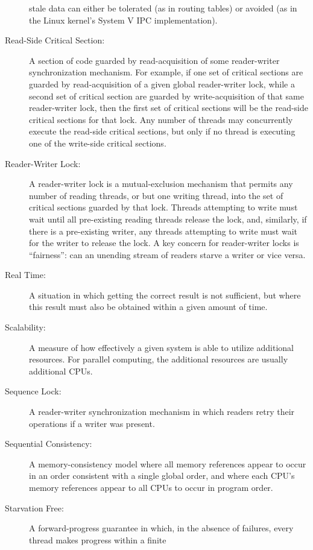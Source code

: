 \begin{description}
	stale data can either be tolerated (as in routing tables)
	or avoided (as in the Linux kernel's System V IPC implementation).
\item[Read-Side Critical Section:]
	A section of code guarded by read-acquisition of
	some reader-writer synchronization mechanism.
	For example, if one set of critical sections are guarded by
	read-acquisition of
	a given global reader-writer lock, while a second set of critical
	section are guarded by write-acquisition of that same reader-writer
	lock, then the first set of critical sections will be the
	read-side critical sections for that lock.
	Any number of threads may concurrently execute the read-side
	critical sections, but only if no thread is executing one of
	the write-side critical sections.
\item[Reader-Writer Lock:]
	A reader-writer lock is a mutual-exclusion mechanism that
	permits any number of reading
	threads, or but one writing thread, into the set of critical
	sections guarded by that lock.
	Threads attempting to write must wait until all pre-existing
	reading threads release the lock, and, similarly, if there
	is a pre-existing writer, any threads attempting to write must
	wait for the writer to release the lock.
	A key concern for reader-writer locks is ``fairness'':
	can an unending stream of readers starve a writer or vice versa.
\item[Real Time:]
	A situation in which getting the correct result is not sufficient,
	but where this result must also be obtained within a given amount
	of time.
\item[Scalability:]
	A measure of how effectively a given system is able to utilize
	additional resources.
	For parallel computing, the additional resources are usually
	additional CPUs.
\item[Sequence Lock:]
	A reader-writer synchronization mechanism in which readers
	retry their operations if a writer was present.
\item[Sequential Consistency:]
	A memory-consistency model where all memory references appear to occur
	in an order consistent with
	a single global order, and where each CPU's memory references
	appear to all CPUs to occur in program order.
\item[Starvation Free:]
	A forward-progress guarantee in which, in the absence of
	failures, every thread makes progress within a finite

\end{description}
